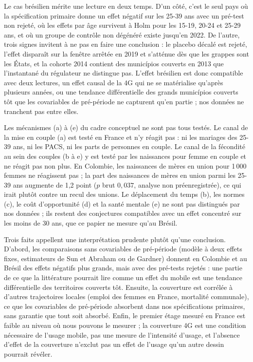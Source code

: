 \documentclass[11pt,a4paper]{article}
\begin{document}
Le cas brésilien mérite une lecture en deux temps. D'un côté, c'est le seul pays où la spécification primaire donne un effet négatif sur les 25-39 ans avec un pré-test non rejeté, où les effets par âge survivent à Holm pour les 15-19, 20-24 et 25-29 ans, et où un groupe de contrôle non dégénéré existe jusqu'en 2022. De l'autre, trois signes invitent à ne pas en faire une conclusion : le placebo décalé est rejeté, l'effet disparaît sur la fenêtre arrêtée en 2019 et s'atténue dès que les grappes sont les États, et la cohorte 2014 contient des municípios couverts en 2013 que l'instantané du régulateur ne distingue pas. L'effet brésilien est donc compatible avec deux lectures, un effet causal de la 4G qui ne se matérialise qu'après plusieurs années, ou une tendance différentielle des grands municípios couverts tôt que les covariables de pré-période ne capturent qu'en partie ; nos données ne tranchent pas entre elles.

Les mécanismes (a) à (e) du cadre conceptuel ne sont pas tous testés. Le canal de la mise en couple (a) est testé en France et n'y réagit pas : ni les mariages des 25-39 ans, ni les PACS, ni les parts de personnes en couple. Le canal de la fécondité au sein des couples (b à e) y est testé par les naissances pour femme en couple et ne réagit pas non plus. En Colombie, les naissances de mères en union pour 1\,000 femmes ne réagissent pas ; la part des naissances de mères en union parmi les 25-39 ans augmente de 1,2 point ($p$ brut $0{,}037$, analyse non préenregistrée), ce qui irait plutôt contre un recul des unions. Le déplacement du temps (b), les normes (c), le coût d'opportunité (d) et la santé mentale (e) ne sont pas distingués par nos données ; ils restent des conjectures compatibles avec un effet concentré sur les moins de 30 ans, que ce papier ne mesure qu'au Brésil.

Trois faits appellent une interprétation prudente plutôt qu'une conclusion. D'abord, les comparaisons sans covariables de pré-période (modèle à deux effets fixes, estimateurs de Sun et Abraham ou de Gardner) donnent en Colombie et au Brésil des effets négatifs plus grands, mais avec des pré-tests rejetés : une partie de ce que la littérature pourrait lire comme un effet du mobile est une tendance différentielle des territoires couverts tôt. Ensuite, la couverture est corrélée à d'autres trajectoires locales (emploi des femmes en France, mortalité communale), ce que les covariables de pré-période absorbent dans nos spécifications primaires, sans garantie que tout soit absorbé. Enfin, le premier étage mesuré en France est faible au niveau où nous pouvons le mesurer ; la couverture 4G est une condition nécessaire de l'usage mobile, pas une mesure de l'intensité d'usage, et l'absence d'effet de la couverture n'exclut pas un effet de l'usage qu'un autre dessin pourrait révéler.
\end{document}
